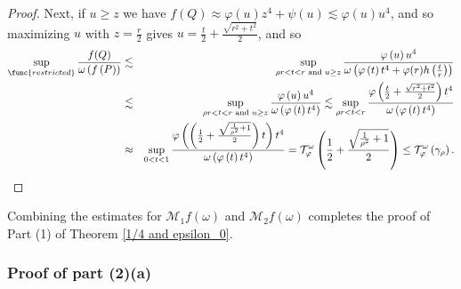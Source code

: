 \documentclass{amsart}
\theoremstyle{plain}
\numberwithin{equation}{section}
\begin{document}
\begin{proof}
Next, if $u\geq z$ we have $f(Q)\approx \varphi \left( u\right) z^{4}+\psi
\left( u\right) \lesssim \varphi \left( u\right) u^{4}$, and so maximizing $%
u $ with $z=\frac{r}{2}$ gives $u=\frac{t}{2}+\frac{\sqrt{r^{2}+t^{2}}}{2}$,
and so%
\begin{eqnarray*}
\sup_{\func{restricted}}\frac{f(Q)}{\omega \left( f\left( P\right) \right) }
&\lesssim &\sup_{\rho r<t<r\text{ and }u\geq z}\frac{\varphi \left( u\right)
u^{4}}{\omega \left( \varphi \left( t\right) t^{4}+\varphi (r)h\left( \frac{t%
}{r}\right) \right) } \\
&\lesssim &\sup_{\rho r<t<r\text{ and }u\geq z}\frac{\varphi \left( u\right)
u^{4}}{\omega \left( \varphi \left( t\right) t^{4}\right) }\lesssim
\sup_{\rho r<t<r}\frac{\varphi \left( \frac{t}{2}+\frac{\sqrt{r^{2}+t^{2}}}{2%
}\right) t^{4}}{\omega \left( \varphi \left( t\right) t^{4}\right) } \\
&\approx &\sup_{0<t<1}\frac{\varphi \left( \left( \frac{1}{2}+\frac{\sqrt{%
\frac{1}{\rho ^{2}}+1}}{2}\right) t\right) t^{4}}{\omega \left( \varphi
\left( t\right) t^{4}\right) }=\mathcal{T}_{\varphi }^{\omega }\left( \frac{1%
}{2}+\frac{\sqrt{\frac{1}{\rho ^{2}}+1}}{2}\right) \leq \mathcal{T}_{\varphi
}^{\omega }\left( \gamma _{\rho }\right) .
\end{eqnarray*}
\end{proof}

Combining the estimates for $\mathcal{M}_{1}f\left( \omega \right) $ and $%
\mathcal{M}_{2}f\left( \omega \right) $ completes the proof of Part (1) of
Theorem \ref{1/4 and epsilon_0}.

\subsubsection{Proof of part (2)(a)}
\end{document}
